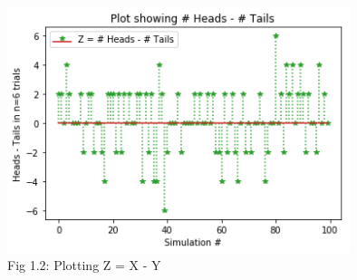 \documentclass[journal,12pt,twocolumn]{IEEEtran}
\begin{document}
\begin{figure}[h!]
    \includegraphics[width=10cm]{Compulsory-Assignment/Code/Figure/binom_3_7_H_-_T.png}
    \caption*{Fig 1.2: Plotting Z = X - Y}
\end{figure}
\end{document}
